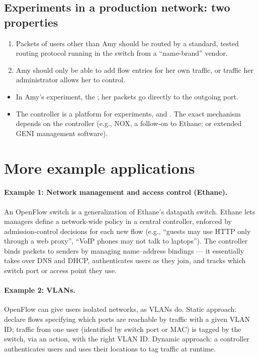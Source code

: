 \subsection{Experiments in a production network: two properties}
\begin{enumerate}
\item Packets of users other than Amy should be routed by a standard, tested routing protocol running in the switch from a ``name-brand'' vendor.
\item Amy should only be able to add flow entries for her own traffic, or traffic her administrator allows her to control.
\end{enumerate}
\begin{itemize}
\item {} In Amy's experiment, the ; her packets go directly to the outgoing port.
\item {} The controller is a platform for experiments, and . The exact mechanism depends on the controller (e.g., NOX, a follow-on to Ethane; or extended GENI management software).
\end{itemize}

\section{More example applications}
\paragraph{Example 1: Network management and access control (Ethane).} An OpenFlow switch is a generalization of Ethane's datapath switch. Ethane lets managers define a network-wide policy in a central controller, enforced by admission-control decisions for each new flow (e.g., ``guests may use HTTP only through a web proxy'', ``VoIP phones may not talk to laptops''). The controller binds packets to senders by managing name--address bindings --- it essentially takes over DNS and DHCP, authenticates users as they join, and tracks which switch port or access point they use.

\paragraph{Example 2: VLANs.} OpenFlow can give users isolated networks, as VLANs do. Static approach: declare flows specifying which ports are reachable by traffic with a given VLAN ID; traffic from one user (identified by switch port or MAC) is tagged by the switch, via an action, with the right VLAN ID. Dynamic approach: a controller authenticates users and uses their locations to tag traffic at runtime.

